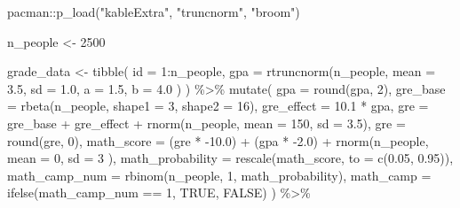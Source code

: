 \documentclass[]{tufte-handout}
\newenvironment{Shaded}{}{}
\newcommand{\AttributeTok}[1]{\textcolor[rgb]{0.49,0.56,0.16}{#1}}
\newcommand{\ConstantTok}[1]{\textcolor[rgb]{0.53,0.00,0.00}{#1}}
\newcommand{\DecValTok}[1]{\textcolor[rgb]{0.25,0.63,0.44}{#1}}
\newcommand{\FloatTok}[1]{\textcolor[rgb]{0.25,0.63,0.44}{#1}}
\newcommand{\FunctionTok}[1]{\textcolor[rgb]{0.02,0.16,0.49}{#1}}
\newcommand{\NormalTok}[1]{#1}
\newcommand{\OtherTok}[1]{\textcolor[rgb]{0.00,0.44,0.13}{#1}}
\newcommand{\SpecialCharTok}[1]{\textcolor[rgb]{0.25,0.44,0.63}{#1}}
\newcommand{\StringTok}[1]{\textcolor[rgb]{0.25,0.44,0.63}{#1}}
\begin{document}
\begin{Shaded}
\begin{Highlighting}[]
\NormalTok{pacman}\SpecialCharTok{::}\FunctionTok{p\_load}\NormalTok{(}\StringTok{"kableExtra"}\NormalTok{, }\StringTok{"truncnorm"}\NormalTok{, }\StringTok{"broom"}\NormalTok{)}

\NormalTok{n\_people }\OtherTok{\textless{}{-}} \DecValTok{2500}

\NormalTok{grade\_data }\OtherTok{\textless{}{-}} \FunctionTok{tibble}\NormalTok{(}
  \AttributeTok{id =} \DecValTok{1}\SpecialCharTok{:}\NormalTok{n\_people,}
  \AttributeTok{gpa =} \FunctionTok{rtruncnorm}\NormalTok{(n\_people,}
    \AttributeTok{mean =} \FloatTok{3.5}\NormalTok{, }\AttributeTok{sd =} \FloatTok{1.0}\NormalTok{,}
    \AttributeTok{a =} \FloatTok{1.5}\NormalTok{, }\AttributeTok{b =} \FloatTok{4.0}
\NormalTok{  )}
\NormalTok{) }\SpecialCharTok{\%\textgreater{}\%}
  \FunctionTok{mutate}\NormalTok{(}
    \AttributeTok{gpa =} \FunctionTok{round}\NormalTok{(gpa, }\DecValTok{2}\NormalTok{),}
    \AttributeTok{gre\_base =} \FunctionTok{rbeta}\NormalTok{(n\_people, }\AttributeTok{shape1 =} \DecValTok{3}\NormalTok{, }\AttributeTok{shape2 =} \DecValTok{16}\NormalTok{),}
    \AttributeTok{gre\_effect =} \FloatTok{10.1} \SpecialCharTok{*}\NormalTok{ gpa,}
    \AttributeTok{gre =}\NormalTok{ gre\_base }\SpecialCharTok{+}\NormalTok{ gre\_effect }\SpecialCharTok{+} \FunctionTok{rnorm}\NormalTok{(n\_people, }\AttributeTok{mean =} \DecValTok{150}\NormalTok{, }\AttributeTok{sd =} \FloatTok{3.5}\NormalTok{),}
    \AttributeTok{gre =} \FunctionTok{round}\NormalTok{(gre, }\DecValTok{0}\NormalTok{),}
    \AttributeTok{math\_score =}\NormalTok{ (gre }\SpecialCharTok{*} \SpecialCharTok{{-}}\FloatTok{10.0}\NormalTok{) }\SpecialCharTok{+}\NormalTok{ (gpa }\SpecialCharTok{*} \SpecialCharTok{{-}}\FloatTok{2.0}\NormalTok{) }\SpecialCharTok{+} \FunctionTok{rnorm}\NormalTok{(n\_people,}
      \AttributeTok{mean =} \DecValTok{0}\NormalTok{,}
      \AttributeTok{sd =} \DecValTok{3}
\NormalTok{    ),}
    \AttributeTok{math\_probability =} \FunctionTok{rescale}\NormalTok{(math\_score, }\AttributeTok{to =} \FunctionTok{c}\NormalTok{(}\FloatTok{0.05}\NormalTok{, }\FloatTok{0.95}\NormalTok{)),}
    \AttributeTok{math\_camp\_num =} \FunctionTok{rbinom}\NormalTok{(n\_people, }\DecValTok{1}\NormalTok{, math\_probability),}
    \AttributeTok{math\_camp =} \FunctionTok{ifelse}\NormalTok{(math\_camp\_num }\SpecialCharTok{==} \DecValTok{1}\NormalTok{, }\ConstantTok{TRUE}\NormalTok{, }\ConstantTok{FALSE}\NormalTok{)}
\NormalTok{  ) }\SpecialCharTok{\%\textgreater{}\%}

\end{Highlighting}
\end{Shaded}
\end{document}
